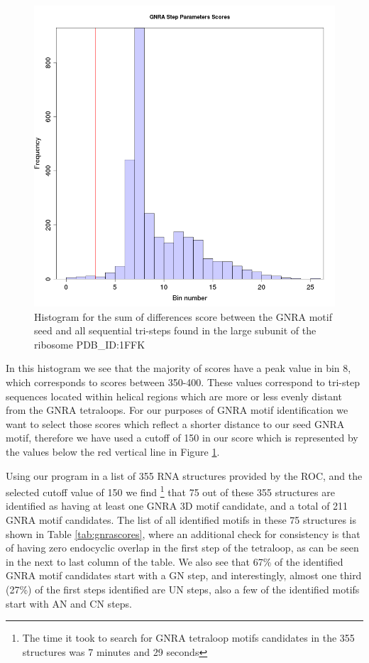 \begin{figure}
\centering 
\includegraphics[angle=0, scale=0.5]{Chapter5/gnrahisto.png}
\caption{Histogram for  the sum of differences score  between the GNRA
  motif seed and  all sequential tri-steps found in  the large subunit
  of the ribosome PDB\_ID:1FFK}
\label{fig:gnrahist}
\end{figure}

In this histogram we see that the majority of scores have a peak value
in bin 8,  which corresponds to scores between  350-400. These values
correspond to tri-step sequences located within helical regions which
are  more or less  evenly distant  from the  GNRA tetraloops.  For our
purposes of GNRA  motif identification we want to  select those scores
which reflect a shorter distance  to our seed GNRA motif, therefore we
have used  a cutoff of  150 in our  score which is represented  by the
values below the red vertical line in Figure \ref{fig:gnrahist}.

Using our program in a list of 355 RNA structures provided by the ROC,
and the  selected cutoff  value of 150  we find \footnote{The  time it
  took  to search  for GNRA  tetraloop  motifs candidates  in the  355
  structures was  7 minutes and 29  seconds} that 75 out  of these 355
structures  are  identified as  having  at  least  one GNRA  3D  motif
candidate, and a total of 211  GNRA motif candidates.  The list of all
identified  motifs   in  these  75   structures  is  shown   in  Table
\ref{tab:gnrascores},  where an  additional check  for  consistency is
that  of having  zero  endocyclic overlap  in  the first  step of  the
tetraloop, as can be seen in the next to last column of the table.  We
also see that 67\% of  the identified GNRA motif candidates start with
a GN  step, and  interestingly, almost one  third (27\%) of  the first
steps identified  are UN  steps, also a  few of the  identified motifs
start with AN and CN steps.

